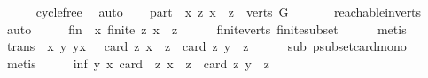 \begin{isabellebody}
\ \ \ \ \isamarkupfalse%
\ cycle{\isacharunderscore}{\kern0pt}free\ \isamarkupfalse%
\ auto\isanewline
\ \ \isamarkupfalse%
\ part{\isacharcolon}{\kern0pt}\ {\isachardoublequoteopen}{\isasymforall}\ x{\isachardot}{\kern0pt}\ {\isacharbraceleft}{\kern0pt}z{\isachardot}{\kern0pt}\ x\ {\isasymrightarrow}\isactrlsup {\isacharplus}{\kern0pt}\ z{\isacharbraceright}{\kern0pt}\ {\isasymsubseteq}\ verts\ G{\isachardoublequoteclose}\ \isanewline
\ \ \ \ \isamarkupfalse%
\ reachable{}{\isacharunderscore}{\kern0pt}in{\isacharunderscore}{\kern0pt}verts\ \ \isamarkupfalse%
\ auto\isanewline
\ \ \isamarkupfalse%
\ \isamarkupfalse%
\ fin{\isacharcolon}{\kern0pt}\ {\isachardoublequoteopen}{\isasymforall}\ x{\isachardot}{\kern0pt}\ finite\ {\isacharbraceleft}{\kern0pt}z{\isachardot}{\kern0pt}\ x\ {\isasymrightarrow}\isactrlsup {\isacharplus}{\kern0pt}\ z{\isacharbraceright}{\kern0pt}{\isachardoublequoteclose}\isanewline
\ \ \ \ \isamarkupfalse%
\ finite{\isacharunderscore}{\kern0pt}verts\ finite{\isacharunderscore}{\kern0pt}subset\isanewline
\ \ \ \ \isamarkupfalse%
\ metis\ \isanewline
\ \ \isamarkupfalse%
\ \isamarkupfalse%
\ trans{\isacharcolon}{\kern0pt}\ {\isachardoublequoteopen}{\isasymforall}\ x\ y{\isachardot}{\kern0pt}\ y{\isasymrightarrow}\isactrlsup {\isacharplus}{\kern0pt}x\ {\isasymlongrightarrow}\ \ card\ {\isacharbraceleft}{\kern0pt}z{\isachardot}{\kern0pt}\ x\ {\isasymrightarrow}\isactrlsup {\isacharplus}{\kern0pt}\ z{\isacharbraceright}{\kern0pt}\ {\isacharless}{\kern0pt}\ card\ {\isacharbraceleft}{\kern0pt}z{\isachardot}{\kern0pt}\ y\ {\isasymrightarrow}\isactrlsup {\isacharplus}{\kern0pt}\ z{\isacharbraceright}{\kern0pt}{\isachardoublequoteclose}\isanewline
\ \ \ \ \isamarkupfalse%
\ sub\ psubset{\isacharunderscore}{\kern0pt}card{\isacharunderscore}{\kern0pt}mono\ \isamarkupfalse%
\ metis\isanewline
\ \ \isamarkupfalse%
\ \isamarkupfalse%
\ inf{\isacharcolon}{\kern0pt}\ {\isachardoublequoteopen}{\isasymforall}y{\isachardot}{\kern0pt}\ {\isasymexists}x{\isachardot}{\kern0pt}\ card\ \ {\isacharbraceleft}{\kern0pt}z{\isachardot}{\kern0pt}\ x\ {\isasymrightarrow}\isactrlsup {\isacharplus}{\kern0pt}\ z{\isacharbraceright}{\kern0pt}\ {\isachargreater}{\kern0pt}\ card\ {\isacharbraceleft}{\kern0pt}z{\isachardot}{\kern0pt}\ y\ {\isasymrightarrow}\isactrlsup {\isacharplus}{\kern0pt}\ z{\isacharbraceright}{\kern0pt}{\isachardoublequoteclose}\isanewline

\end{isabellebody}
